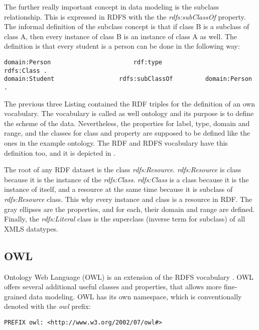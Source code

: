 The further really important concept in data modeling is the subclass relationship. This is expressed in RDFS with the the \textit{rdfs:subClassOf} property. The informal definition of the subclass concept is that if class B is a subclass of class A, then every instance of class B is an instance of class A as well. The definition is that every student is a person can be done in the following way:

\begin{lstlisting}[basicstyle=\footnotesize, captionpos=b, caption=Sub class definition, label=lst:sparql,  belowskip=1em, aboveskip=2em,
frame=single]
domain:Person						rdf:type						rdfs:Class .
domain:Student					rdfs:subClassOf			domain:Person .
\end{lstlisting}

The previous three Listing contained the RDF triples for the definition of an own vocabulary. The vocabulary is called as well ontology and its purpose is to define the scheme of the data. Nevertheless, the properties for label, type, domain and range, and the classes for class and property are supposed to be defined like the ones in the example ontology. The RDF and RDFS vocabulary have this definition too, and it is depicted in .


The root of any RDF dataset is the class \textit{rdfs:Resource}.  \textit{rdfs:Resource} is class because it is the instance of the \textit{rdfs:Class}. \textit{rdfs:Class} is a class because it is the instance of itself, and a resource at the same time because it is subclass of \textit{rdfs:Resource} class. This why every instance and class is a resource in RDF. The gray ellipses are the properties, and for each, their domain and range are defined. Finally, the \textit{rdfs:Literal} class is the superclass (inverse term for subclass) of all XMLS datatypes.

\subsection{OWL}

Ontology Web Language (OWL) is an extension of the RDFS vocabulary \cite{Dean:04:OWO}. OWL offers several additional useful classes and properties, that allows more fine-grained data modeling. OWL has its own namespace, which is conventionally denoted with the \textit{owl} prefix:

\begin{lstlisting}[basicstyle=\footnotesize, captionpos=b, caption=OWL namespace, label=lst:sparql, belowskip=1em, aboveskip=2em,
frame=single]
PREFIX owl: <http://www.w3.org/2002/07/owl#>
\end{lstlisting}

